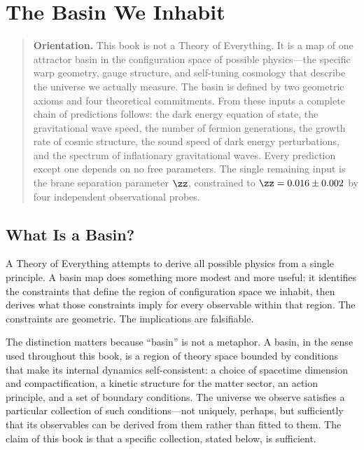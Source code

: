 
\chapter[The Basin We Inhabit]{The Basin We Inhabit}
\label{ch:basin}

\begin{quote}
\textbf{Orientation.}
This book is not a Theory of Everything. It is a map of one attractor
basin in the configuration space of possible physics---the specific
warp geometry, gauge structure, and self-tuning cosmology that describe
the universe we actually measure. The basin is defined by two geometric
axioms and four theoretical commitments. From these inputs a complete
chain of predictions follows: the dark energy equation of state, the
gravitational wave speed, the number of fermion generations, the growth
rate of cosmic structure, the sound speed of dark energy perturbations,
and the spectrum of inflationary gravitational waves. Every prediction
except one depends on no free parameters. The single remaining input
is the brane separation parameter $\zz$, constrained to
$\zz = 0.016 \pm 0.002$ by four independent observational probes.
\end{quote}

\section{What Is a Basin?}
\label{sec:0-basin}

A Theory of Everything attempts to derive all possible physics from a
single principle. A basin map does something more modest and more
useful: it identifies the constraints that define the region of
configuration space we inhabit, then derives what those constraints
imply for every observable within that region. The constraints are
geometric. The implications are falsifiable.

The distinction matters because ``basin'' is not a metaphor. A basin,
in the sense used throughout this book, is a region of theory space
bounded by conditions that make its internal dynamics self-consistent:
a choice of spacetime dimension and compactification, a kinetic
structure for the matter sector, an action principle, and a set of
boundary conditions. The universe we observe satisfies a particular
collection of such conditions---not uniquely, perhaps, but sufficiently
that its observables can be derived from them rather than fitted to
them. The claim of this book is that a specific collection, stated
below, is sufficient.

